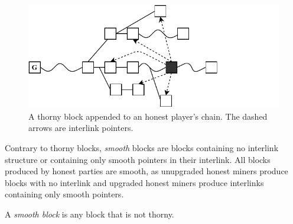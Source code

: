 \begin{figure}[h]
	\begin{center}
		\includegraphics[width=0.9\columnwidth]{figures/thorny_block.pdf}
	\end{center}
	\caption{A thorny block appended to an honest player's chain.
	The dashed arrows are interlink pointers.}
	\label{fig:thorny_block}
\end{figure}

Contrary to thorny blocks, \emph{smooth} blocks are blocks containing no interlink structure or containing only smooth pointers in their interlink. All blocks produced by honest parties are smooth, as unupgraded honest miners produce blocks with no interlink and upgraded honest miners produce interlinks containing only smooth pointers.

\begin{definition}
	A \emph{smooth block} is any block that is not thorny.
	\label{defn:smooth_block}
\end{definition}
